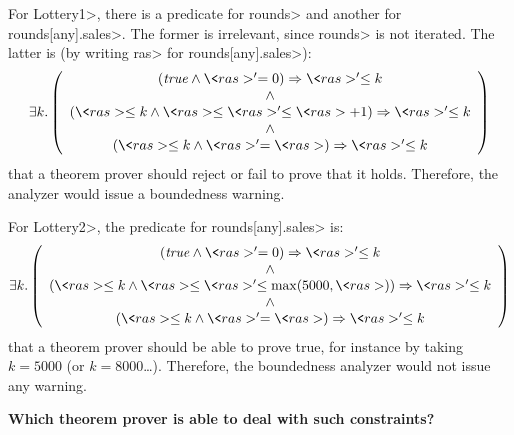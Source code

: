 For \<Lottery1>, there is a predicate for \<rounds> and another for
\<rounds[any].sales>. The former is irrelevant, since \<rounds> is not
iterated. The latter is (by writing \<ras> for \<rounds[any].sales>):
%
\[
  \exists k.\left(\begin{array}{c}
    (\mathit{true}\wedge\<ras>'=0)\Rightarrow\<ras>'\le k\\
    \wedge\\
    (\<ras>\le k\wedge\<ras>\le\<ras>'\le\<ras>+1)\Rightarrow\<ras>'\le k\\
    \wedge\\
    (\<ras>\le k\wedge\<ras>'=\<ras>)\Rightarrow\<ras>'\le k
  \end{array}\right)
\]
%
that a theorem prover should reject or fail to prove that it holds. Therefore,
the analyzer would issue a boundedness warning.

For \<Lottery2>, the predicate for \<rounds[any].sales> is:
%
\[
  \exists k.\left(\begin{array}{c}
    (\mathit{true}\wedge\<ras>'=0)\Rightarrow\<ras>'\le k\\
    \wedge\\
    (\<ras>\le k\wedge\<ras>\le\<ras>'\le\max(5000,\<ras>))\Rightarrow\<ras>'\le k\\
    \wedge\\
    (\<ras>\le k\wedge\<ras>'=\<ras>)\Rightarrow\<ras>'\le k
  \end{array}\right)
\]
%
that a theorem prover should be able to prove true, for instance by taking
$k=5000$ (or $k=8000$\ldots). Therefore, the boundedness analyzer would not
issue any warning.

\textbf{Which theorem prover is able to deal with such constraints?}
